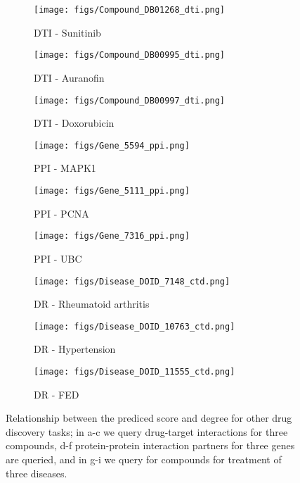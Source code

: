 \begin{figure*}[!ht]
	\centering
	\begin{subfigure}[b]{0.3\textwidth}
		\centering
		\texttt{[image: figs/Compound\_DB01268\_dti.png]}
		\caption{DTI - Sunitinib}\label{fig:other-tasks:dti1}
	\end{subfigure}
	\begin{subfigure}[b]{0.3\textwidth}
		\centering
		\texttt{[image: figs/Compound\_DB00995\_dti.png]}
		\caption{DTI - Auranofin}\label{fig:other-tasks:dti2}
	\end{subfigure}
	\begin{subfigure}[b]{0.3\textwidth}
		\centering
		\texttt{[image: figs/Compound\_DB00997\_dti.png]}
		\caption{DTI - Doxorubicin}\label{fig:other-tasks:dti3}
	\end{subfigure}

	\begin{subfigure}[b]{0.3\textwidth}
		\centering
		\texttt{[image: figs/Gene\_5594\_ppi.png]}
		\caption{PPI - MAPK1}\label{fig:other-tasks:ppi1}
	\end{subfigure}
	\begin{subfigure}[b]{0.3\textwidth}
		\centering
		\texttt{[image: figs/Gene\_5111\_ppi.png]}
		\caption{PPI - PCNA}\label{fig:other-tasks:ppi2}
	\end{subfigure}
	\begin{subfigure}[b]{0.3\textwidth}
		\centering
		\texttt{[image: figs/Gene\_7316\_ppi.png]}
		\caption{PPI - UBC}\label{fig:other-tasks:ppi3}
	\end{subfigure}

	\begin{subfigure}[b]{0.3\textwidth}
		\centering
		\texttt{[image: figs/Disease\_DOID\_7148\_ctd.png]}
		\caption{DR - Rheumatoid arthritis}\label{fig:other-tasks:ctd1}
	\end{subfigure}
	\begin{subfigure}[b]{0.3\textwidth}
		\centering
		\texttt{[image: figs/Disease\_DOID\_10763\_ctd.png]}
		\caption{DR - Hypertension}\label{fig:other-tasks:ctd2}
	\end{subfigure}
	\begin{subfigure}[b]{0.3\textwidth}
		\centering
		\texttt{[image: figs/Disease\_DOID\_11555\_ctd.png]}
		\caption{DR - FED}\label{fig:other-tasks:ctd3}
	\end{subfigure}
	\caption{Relationship between the prediced score and degree for other drug discovery tasks;  in a-c we query drug-target interactions for three compounds, d-f protein-protein interaction partners for three genes  are queried, and in g-i we query for compounds for treatment of three diseases.}
	\label{fig:other-tasks}
\end{figure*}

